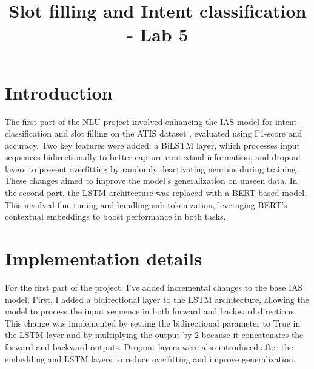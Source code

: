 \documentclass[a4paper]{article}
\title{Slot filling and Intent classification  - Lab 5}
\begin{document}
\maketitle
%
%
\section{Introduction}
The first part of the NLU project involved enhancing the IAS model for intent 
classification and slot filling on the ATIS dataset \cite{nlu-labs-unitn}, evaluated using F1-score and
 accuracy. Two key features were added: a BiLSTM layer, which processes input 
 sequences bidirectionally to better capture contextual information, and dropout 
 layers to prevent overfitting by randomly deactivating neurons during training.
 These changes aimed to improve the model’s generalization on unseen data. In the 
 second part, the LSTM architecture was replaced with a BERT-based model. This 
 involved fine-tuning and handling sub-tokenization, leveraging BERT’s contextual
 embeddings to boost performance in both tasks.
\section{Implementation details}
For the first part of the project, I've added incremental changes to the base IAS model.
First, I added a bidirectional layer to the LSTM architecture, allowing the model to
process the input sequence in both forward and backward directions. 
This change was implemented by setting the bidirectional parameter to True in the LSTM layer and by multiplying the output
 by 2 because it concatenates the forward and backward outputs.
 Dropout layers were also introduced after the embedding and LSTM layers to reduce overfitting and improve generalization.
\end{document}
